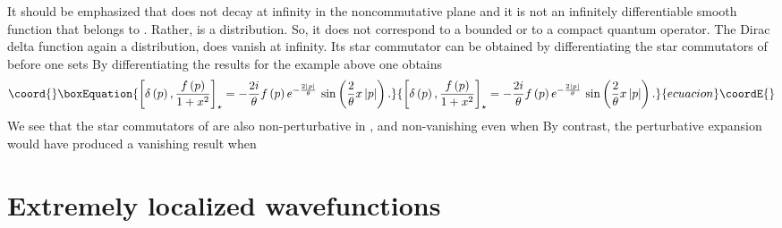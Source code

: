 \documentclass[a4paper,12pt]{article}
\begin{document}
It should be emphasized that \coordHE{} does not decay
at infinity in the noncommutative plane and it is not an infinitely
differentiable smooth function that belongs to \coordHE{}. Rather, \coordHE{} is a distribution. So, it does not correspond
to a bounded or to a compact quantum operator. The Dirac delta function \coordHE{} again a distribution, does vanish at infinity. Its
star commutator can be obtained by differentiating the star commutators of \coordHE{} before one sets \coordHE{} By
differentiating the results for the example above one obtains
\begin{equation*}\coord{}\boxEquation{
\left[ \delta \left( p\right) ,\frac{f\left( p\right) }{1+x^{2}}\right]
_{\star }=-\frac{2i}{\theta }f\left( p\right) e^{-\frac{2\left| p\right| }{
\theta }}\,\sin \left( \frac{2}{\theta }x\left| p\right| \right) .
}{
\left[ \delta \left( p\right) ,\frac{f\left( p\right) }{1+x^{2}}\right]
_{\star }=-\frac{2i}{\theta }f\left( p\right) e^{-\frac{2\left| p\right| }{
\theta }}\,\sin \left( \frac{2}{\theta }x\left| p\right| \right) .
}{ecuacion}\coordE{}\end{equation*}
We see that the star commutators of \coordHE{} are also
non-perturbative in \myHighlight{$\theta $}\coordHE{}, and non-vanishing even when \coordHE{} By
contrast, the perturbative expansion would have produced a vanishing result
when \coordHE{}

\section{Extremely localized wavefunctions}
\end{document}
